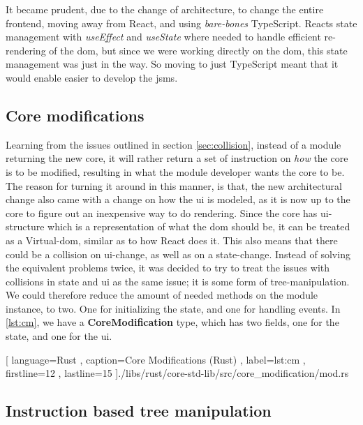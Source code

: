 It became prudent, due to the change of architecture, to change the entire
frontend, moving away from React, and using \textit{bare-bones} TypeScript.
Reacts state management with \textit{useEffect} and \textit{useState} where
needed to handle efficient re-rendering of the \gls{dom}, but since we were
working directly on the \gls{dom}, this state management was just in the way. So
moving to just TypeScript meant that it would enable easier to develop the
\gls*{jsms}.

\subsection{Core modifications}

Learning from the issues outlined in section \ref{sec:collision}, instead of a
module returning the new core, it will rather return a set of instruction on
\textit{how} the core is to be modified, resulting in what the module developer
wants the core to be. The reason for turning it around in this manner, is that,
the new architectural change also came with a change on how the \gls*{ui} is
modeled, as it is now up to the core to figure out an inexpensive way to do
rendering. Since the core has \gls*{ui}-structure which is a representation of
what the \gls*{dom} should be, it can be treated as a Virtual-\gls*{dom}, similar
as to how React does it. This also means that there could be a collision on
\gls*{ui}-change, as well as on a state-change. Instead of solving the equivalent
problems twice, it was decided to try to treat the issues with collisions in
state and \gls*{ui} as the same issue; it is some form of tree-manipulation. We
could therefore reduce the amount of needed methods on the module instance, to
two. One for initializing the state, and one for handling events. In
\ref{lst:cm}, we have a \textbf{CoreModification} type, which has two fields,
one for the state, and one for the \gls*{ui}.

\begin{center}
  
    [ language=Rust
    , caption={Core Modifications (Rust)}
    , label=lst:cm
    , firstline=12
    , lastline=15
    ]{./libs/rust/core-std-lib/src/core_modification/mod.rs}
\end{center}

\subsection{Instruction based tree manipulation}

